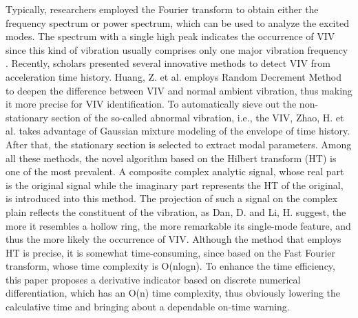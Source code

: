 \documentclass[preprint, 3p, times, compress, 11pt]{elsarticle}
\begin{document}
Typically, researchers employed the Fourier transform to obtain either 
the frequency spectrum or power spectrum, which can be used to analyze 
the excited modes. The spectrum with a single high peak indicates the 
occurrence of VIV since this kind of vibration usually comprises only 
one major vibration frequency \cite{li2018datadriven}. 
Recently, scholars presented several innovative methods to detect VIV 
from acceleration time history. Huang, Z. et al. \cite{huang2019automatic} 
employs Random Decrement Method to deepen the difference between VIV 
and normal ambient vibration, thus making it more precise for VIV 
identification. To automatically sieve out the non-stationary section of 
the so-called abnormal vibration, i.e., the VIV, Zhao, H. et al. 
\cite{zhao2022statemonitoring} takes advantage of Gaussian mixture 
modeling of the envelope of time history. After that, the stationary 
section is selected to extract modal parameters. Among all these methods, 
the novel algorithm based on the Hilbert transform (HT) 
is one of the most prevalent. A composite complex analytic signal, whose 
real part is the original signal while the imaginary part represents the 
HT of the original, is introduced into this method. The projection of 
such a signal on the complex plain reflects the constituent of the 
vibration, as Dan, D. and Li, H. \cite{dan2022monitoring} suggest, the 
more it resembles a hollow ring, the more remarkable its single-mode feature, 
and thus the more likely the occurrence of VIV. 
Although the method that employs HT is precise, it is somewhat 
time-consuming, since based on the Fast Fourier transform, whose time 
complexity is O(nlogn). To enhance the time efficiency, this paper 
proposes a derivative indicator based on discrete numerical 
differentiation, which has an O(n) time complexity, thus obviously 
lowering the calculative time and bringing about a dependable on-time warning. 
\end{document}
